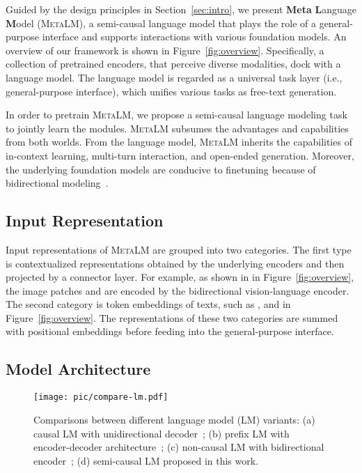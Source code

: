 \documentclass{article}
\theoremstyle{plain}
\theoremstyle{definition}
\theoremstyle{remark}
\newcommand\ours{\textsc{MetaLM}}
\begin{document}
Guided by the design principles in Section~\ref{sec:intro}, we present \textbf{Meta} \textbf{L}anguage \textbf{M}odel (\ours{}), a semi-causal language model that plays the role of a general-purpose interface and supports interactions with various foundation models.
An overview of our framework is shown in Figure~\ref{fig:overview}.
Specifically, a collection of pretrained encoders, that perceive diverse modalities, dock with a language model.
The language model is regarded as a universal task layer (i.e., general-purpose interface), which unifies various tasks as free-text generation.

In order to pretrain \ours{}, we propose a semi-causal language modeling task to jointly learn the modules.
\ours{} subsumes the advantages and capabilities from both worlds.
From the language model, \ours{} inherits the capabilities of in-context learning, multi-turn interaction, and open-ended generation.
Moreover, the underlying foundation models are conducive to finetuning because of bidirectional modeling~\citep{what:lm:objective}.


\subsection{Input Representation}

Input representations of \ours{} are grouped into two categories.
The first type is contextualized representations obtained by the underlying encoders and then projected by a connector layer.
For example, as shown in in Figure~\ref{fig:overview}, the image patches and  are encoded by the bidirectional vision-language encoder.
The second category is token embeddings of texts, such as , and  in Figure~\ref{fig:overview}.
The representations of these two categories are summed with positional embeddings before feeding into the general-purpose interface.


\subsection{Model Architecture}
\label{sec:method:arch}

\begin{figure*}[t]
\centering
\texttt{[image: pic/compare-lm.pdf]}
\caption{Comparisons between different language model (LM) variants: (a) causal LM with unidirectional decoder~\citep{gpt3}; (b) prefix LM with encoder-decoder architecture~\citep{t5}; (c) non-causal LM with bidirectional encoder~\citep{bert}; (d) semi-causal LM proposed in this work.}
\label{fig:compare:lm}
\end{figure*}
\end{document}

